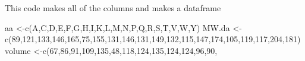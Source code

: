 \documentclass[
]{book}
\newenvironment{Shaded}{\begin{snugshade}}{\end{snugshade}}
\newcommand{\DecValTok}[1]{\textcolor[rgb]{0.00,0.00,0.81}{#1}}
\newcommand{\FunctionTok}[1]{\textcolor[rgb]{0.00,0.00,0.00}{#1}}
\newcommand{\NormalTok}[1]{#1}
\newcommand{\OtherTok}[1]{\textcolor[rgb]{0.56,0.35,0.01}{#1}}
\newcommand{\StringTok}[1]{\textcolor[rgb]{0.31,0.60,0.02}{#1}}
\begin{document}
This code makes all of the columns and makes a dataframe

\begin{Shaded}
\begin{Highlighting}[]
\NormalTok{aa        }\OtherTok{\textless{}{-}}\FunctionTok{c}\NormalTok{(}\StringTok{\textquotesingle{}A\textquotesingle{}}\NormalTok{,}\StringTok{\textquotesingle{}C\textquotesingle{}}\NormalTok{,}\StringTok{\textquotesingle{}D\textquotesingle{}}\NormalTok{,}\StringTok{\textquotesingle{}E\textquotesingle{}}\NormalTok{,}\StringTok{\textquotesingle{}F\textquotesingle{}}\NormalTok{,}\StringTok{\textquotesingle{}G\textquotesingle{}}\NormalTok{,}\StringTok{\textquotesingle{}H\textquotesingle{}}\NormalTok{,}\StringTok{\textquotesingle{}I\textquotesingle{}}\NormalTok{,}\StringTok{\textquotesingle{}K\textquotesingle{}}\NormalTok{,}\StringTok{\textquotesingle{}L\textquotesingle{}}\NormalTok{,}\StringTok{\textquotesingle{}M\textquotesingle{}}\NormalTok{,}\StringTok{\textquotesingle{}N\textquotesingle{}}\NormalTok{,}\StringTok{\textquotesingle{}P\textquotesingle{}}\NormalTok{,}\StringTok{\textquotesingle{}Q\textquotesingle{}}\NormalTok{,}\StringTok{\textquotesingle{}R\textquotesingle{}}\NormalTok{,}\StringTok{\textquotesingle{}S\textquotesingle{}}\NormalTok{,}\StringTok{\textquotesingle{}T\textquotesingle{}}\NormalTok{,}\StringTok{\textquotesingle{}V\textquotesingle{}}\NormalTok{,}\StringTok{\textquotesingle{}W\textquotesingle{}}\NormalTok{,}\StringTok{\textquotesingle{}Y\textquotesingle{}}\NormalTok{)}
\NormalTok{MW.da     }\OtherTok{\textless{}{-}}\FunctionTok{c}\NormalTok{(}\DecValTok{89}\NormalTok{,}\DecValTok{121}\NormalTok{,}\DecValTok{133}\NormalTok{,}\DecValTok{146}\NormalTok{,}\DecValTok{165}\NormalTok{,}\DecValTok{75}\NormalTok{,}\DecValTok{155}\NormalTok{,}\DecValTok{131}\NormalTok{,}\DecValTok{146}\NormalTok{,}\DecValTok{131}\NormalTok{,}\DecValTok{149}\NormalTok{,}\DecValTok{132}\NormalTok{,}\DecValTok{115}\NormalTok{,}\DecValTok{147}\NormalTok{,}\DecValTok{174}\NormalTok{,}\DecValTok{105}\NormalTok{,}\DecValTok{119}\NormalTok{,}\DecValTok{117}\NormalTok{,}\DecValTok{204}\NormalTok{,}\DecValTok{181}\NormalTok{)}
\NormalTok{volume    }\OtherTok{\textless{}{-}}\FunctionTok{c}\NormalTok{(}\DecValTok{67}\NormalTok{,}\DecValTok{86}\NormalTok{,}\DecValTok{91}\NormalTok{,}\DecValTok{109}\NormalTok{,}\DecValTok{135}\NormalTok{,}\DecValTok{48}\NormalTok{,}\DecValTok{118}\NormalTok{,}\DecValTok{124}\NormalTok{,}\DecValTok{135}\NormalTok{,}\DecValTok{124}\NormalTok{,}\DecValTok{124}\NormalTok{,}\DecValTok{96}\NormalTok{,}\DecValTok{90}\NormalTok{,}

\end{Highlighting}
\end{Shaded}
\end{document}
